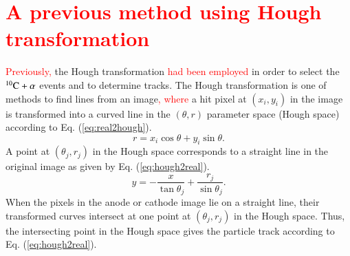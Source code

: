 \documentclass{jps-cp}
\begin{document}
\section{\textcolor{red}{A previous method using Hough transformation}}
\textcolor{red}{Previously,} the Hough transformation \textcolor{red}{had been employed} in order to
select the ${}^{10}\rm{C}+\alpha$ events and to determine tracks.
The Hough transformation is one of methods to find lines from an image\textcolor{red}{, where} 
a hit pixel at $(x_{i}, y_{i})$ in the image
is transformed into
a curved line in the $(\theta, r)$ parameter space (Hough space)
according to Eq. (\ref{eq:real2hough}).
\begin{equation}
  \label{eq:real2hough}
  r = x_{i}\cos\theta+y_{i}\sin\theta. 
\end{equation}
A point at $(\theta_{j}, r_{j})$ in the Hough space corresponds to a straight line
in the original image as given by Eq. (\ref{eq:hough2real}).
\begin{equation}
  \label{eq:hough2real}
  y = -\frac{x}{\tan\theta_{j}}+\frac{r_{j}}{\sin\theta_{j}}. 
\end{equation}
When the pixels in the anode or cathode image lie on a straight line,
their transformed curves intersect at one point at $(\theta_{j}, r_{j})$ in the Hough space.
Thus, the intersecting point in the Hough space gives the particle track according to Eq. (\ref{eq:hough2real}).
\end{document}
